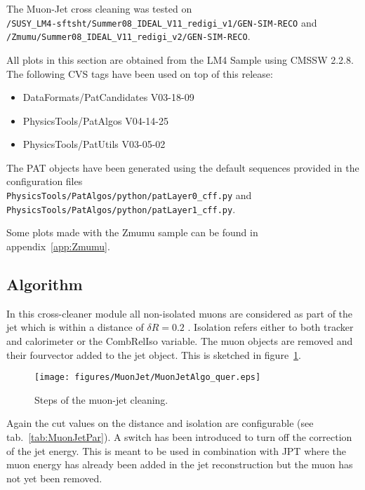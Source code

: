 \documentclass{cmspaper}
\begin{document}
The Muon-Jet cross cleaning was tested on \\
\texttt{/SUSY\_LM4-sftsht/Summer08\_IDEAL\_V11\_redigi\_v1/GEN-SIM-RECO} and\\
\texttt{/Zmumu/Summer08\_IDEAL\_V11\_redigi\_v2/GEN-SIM-RECO}.

All plots in this section are obtained from the LM4 Sample using CMSSW 2.2.8.
The following CVS tags have been used on top of this release:
\begin{itemize}
    \item DataFormats/PatCandidates V03-18-09      
    \item PhysicsTools/PatAlgos     V04-14-25      
    \item PhysicsTools/PatUtils     V03-05-02      
\end{itemize}
The PAT objects
have been generated using the default sequences provided in the configuration
files\\
\texttt{PhysicsTools/PatAlgos/python/patLayer0\_cff.py} and\\
\texttt{PhysicsTools/PatAlgos/python/patLayer1\_cff.py}.

Some plots made with the Zmumu sample can be found in appendix~\ref{app:Zmumu}.


\subsection{Algorithm}
In this cross-cleaner module all non-isolated muons are considered as part of
the jet which is within a distance of $\delta R=0.2$ . Isolation refers either
to both tracker and calorimeter or the CombRelIso variable. The muon objects are
removed and their fourvector added to the jet object. 
This is sketched in figure~\ref{fig:MJCleaning}.

\begin{figure}[hbt]
\begin{center}
\texttt{[image: figures/MuonJet/MuonJetAlgo\_quer.eps]}
\caption{Steps of the muon-jet cleaning.}
\label{fig:MJCleaning}
\end{center}
\end{figure}

Again the cut values on the distance and isolation are configurable (see
tab.~\ref{tab:MuonJetPar}). A switch has been introduced to turn off the
correction of the jet energy. This is meant to be used in combination with JPT
where the muon energy has already been added in the jet reconstruction but the
muon has not yet been removed.
\end{document}
